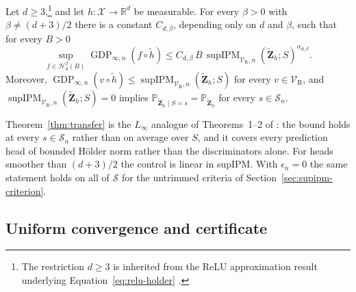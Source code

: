\begin{theorem}
\label{thm:transfer}
Let $d\ge3$,\footnote{The restriction $d\ge3$ is inherited from the ReLU approximation result underlying Equation~\ref{eq:relu-holder} \citep[Theorem~2]{park2025relu}.} and let $h:\mathcal{X}\to\mathbb{R}^d$ be measurable.  For every $\beta>0$ with $\beta\ne(d+3)/2$ there is a constant $C_{d,\beta}$, depending only on $d$ and $\beta$, such that for every $B>0$
\begin{equation}
  \sup_{f\in\mathcal{H}^{\beta}_d(B)}
  \operatorname{GDP}_{\infty,n}(f\circ\widetilde{h})
  \le C_{d,\beta}\,B\,
  \operatorname{supIPM}_{\mathcal{V}_{\mathrm{R}},n}(\widetilde{\mathbf{Z}}_h;S)^{\alpha_{d,\beta}} .
  \label{eq:transfer}
\end{equation}
Moreover, $\operatorname{GDP}_{\infty,n}(v\circ\widetilde{h})\le\operatorname{supIPM}_{\mathcal{V}_{\mathrm{R}},n}(\widetilde{\mathbf{Z}}_h;S)$ for every $v\in\mathcal{V}_{\mathrm{R}}$, and $\operatorname{supIPM}_{\mathcal{V}_{\mathrm{R}},n}(\widetilde{\mathbf{Z}}_h;S)=0$ implies $\mathbb{P}_{\widetilde{\mathbf{Z}}_h\mid S=s}=\mathbb{P}_{\widetilde{\mathbf{Z}}_h}$ for every $s\in\mathcal{S}_n$.
\end{theorem}

Theorem~\ref{thm:transfer} is the $L_{\infty}$ analogue of Theorems~1--2 of \citet{kong2025fair}: the bound holds at every $s\in\mathcal{S}_n$ rather than on average over $S$, and it covers every prediction head of bounded H\"older norm rather than the discriminators alone.  For heads smoother than $(d+3)/2$ the control is linear in supIPM.  With $\epsilon_n=0$ the same statement holds on all of $\mathcal{S}$ for the untrimmed criteria of Section~\ref{sec:supipm-criterion}.

\subsection{Uniform convergence and certificate}
\label{sec:theory-uniform}

